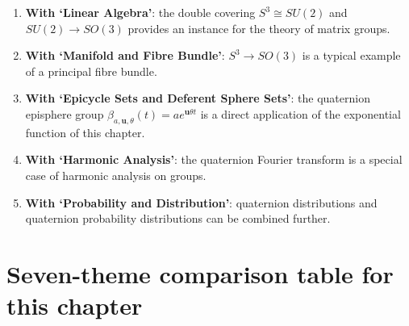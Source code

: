 \begin{remark}\label{rem:q_interfaces}
\begin{enumerate}[label=(\roman*)]
    \item \textbf{With `Linear Algebra'}: the double covering $S^3\cong SU(2)$ and $SU(2)\to SO(3)$ provides an instance for the theory of matrix groups.
    \item \textbf{With `Manifold and Fibre Bundle'}: $S^3\to SO(3)$ is a typical example of a principal fibre bundle.
    \item \textbf{With `Epicycle Sets and Deferent Sphere Sets'}: the quaternion episphere group $\beta_{a,\mathbf{u},\theta}(t)=ae^{\mathbf{u}\theta t}$ is a direct application of the exponential function of this chapter.
    \item \textbf{With `Harmonic Analysis'}: the quaternion Fourier transform is a special case of harmonic analysis on groups.
    \item \textbf{With `Probability and Distribution'}: quaternion distributions and quaternion probability distributions can be combined further.
\end{enumerate}
\end{remark}

\section*{Seven-theme comparison table for this chapter}

